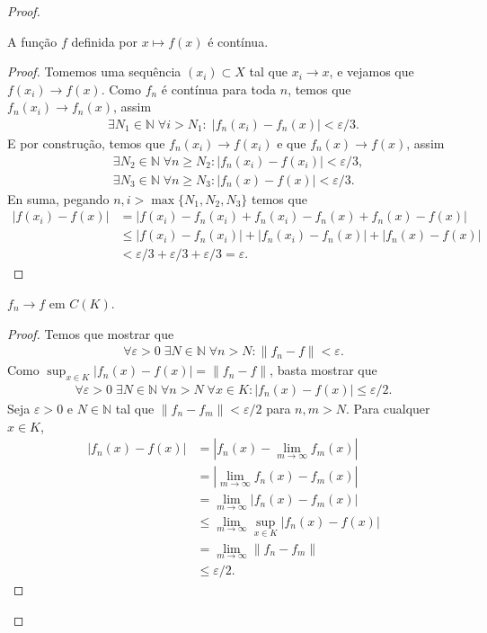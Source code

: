 \documentclass[portuguese]{article}
\theoremstyle{definition}
\newcommand{\N}{\mathbb{N}}
\begin{document}
\begin{proof}
\begin{equation}
		\end{equation}
		\begin{af*}
			A função $f$ definida por $x\mapsto f(x)$ é contínua.
		\end{af*}
		\begin{proof}
			Tomemos uma sequência $(x_i)\subset X$ tal que $x_i\to x$, e vejamos que $f(x_i)\to f(x)$. Como $f_n$ é contínua para toda $n$, temos que $f_n(x_i)\to f_n(x)$, assim
			\begin{align*}
				\exists N_1\in\N\;\forall i>N_1:\; |f_n(x_i)-f_n(x)|<\varepsilon/3.
			\end{align*}
			E por construção, temos que $f_n(x_i)\to f(x_i)$ e que $f_n(x)\to f(x)$, assim
			\begin{align*}
				&\exists N_2\in\N\;\forall n\geq N_2:|f_n(x_i)-f(x_i)|<\varepsilon/3,\\
				&\exists N_3\in\N\;\forall n\geq N_3:|f_n(x)-f(x)|<\varepsilon/3.
			\end{align*}
			En suma, pegando $n,i>\max\{N_1,N_2,N_3\}$ temos que
			\begin{align*}
				|f(x_i)-f(x)|&=|f(x_i)-f_n(x_i)+f_n(x_i)-f_n(x)+f_n(x)-f(x)|\\
				&\leq|f(x_i)-f_n(x_i)|+|f_n(x_i)-f_n(x)|+|f_n(x)-f(x)|\\
				&<\varepsilon/3+\varepsilon/3+\varepsilon/3=\varepsilon.
			\end{align*}
		\end{proof}
		
		\begin{af*}
			$f_n\to f$ em $C(K)$.
		\end{af*}
		\begin{proof}
			Temos que mostrar que
			\begin{gather*}
				\forall\varepsilon>0\;\exists N\in\N\;\forall n>N:\| f_n-f\|<\varepsilon.
			\end{gather*}
			Como $\sup_{x\in K}| f_n(x)-f(x)|=\| f_n-f\|$, basta mostrar que
			\begin{gather*}
				\forall\varepsilon>0\;\exists N\in\N\;\forall n>N\;\forall x\in K:| f_n(x)-f(x)|\leq\varepsilon/2.
			\end{gather*}
			Seja $\varepsilon>0$ e $N\in\N$ tal que $\| f_n-f_m\|<\varepsilon/2$ para $n,m>N$. Para cualquer $x\in K$,
			\begin{align*}
				| f_n(x)-f(x)|&=\left|f_n(x)-\lim_{m\to\infty}f_m(x)\right|\\
				&=\left|\lim_{m\to\infty}f_n(x)-f_m(x)\right|\\
				&=\lim_{m\to\infty}|f_n(x)-f_m(x)|\\
				&\leq \lim_{m\to\infty}\sup_{x\in K}| f_n(x)-f(x)|\\
				&=\lim_{m\to\infty}\| f_n-f_m\|\\
				&\leq\varepsilon/2.
			\end{align*}
		\end{proof}
	\end{proof}
	
\end{document}

